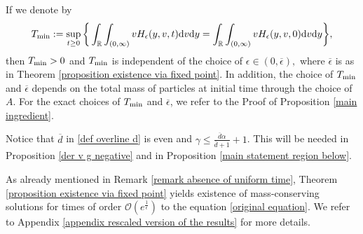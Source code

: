 \documentclass[11pt]{article}
\numberwithin{equation}{section}
\newcommand{\der}{\textup{d}}
\begin{document}
\begin{rmk}\label{remark time change depending on the mass}
If we denote by
    \begin{align*}
        T_{\textup{min}}:=\sup_{t\geq 0}\bigg\{\int_{\mathbb{R}}\int_{(0,\infty)}vH_{\epsilon}(y,v,t)\der v \der y=\int_{\mathbb{R}}\int_{(0,\infty)}vH_{\epsilon}(y,v,0)\der v \der y \bigg\},
    \end{align*}
    then $T_{\textup{min}}>0$ and $T_{\textup{min}}$ is independent of the choice of $\epsilon\in(0,\overline{\epsilon}),$ where $\overline{\epsilon}$ is as in Theorem \ref{proposition existence via fixed point}. In addition, the choice of $T_{\textup{min}}$ and $\overline{\epsilon}$ depends on the total mass of particles at initial time through the choice of $A$. For the exact choices of $T_{\textup{min}}$  and $\overline{\epsilon}$, we refer to the Proof of Proposition \ref{main ingredient}.
\end{rmk}
\begin{rmk}\label{we need function to be even minimum recovered}
 Notice that $\overline{d}$ in \eqref{def overline d} is even and $\gamma\leq \frac{\overline{d}\alpha}{\overline{d}+1}+1$. This will be needed in Proposition \ref{der v g negative} and in Proposition \ref{main statement region below}.
\end{rmk}
\begin{rmk}
As already mentioned in Remark \ref{remark absence of uniform time}, Theorem \ref{proposition existence via fixed point}  yields existence of mass-conserving solutions for times of order $\mathcal{O}(e^{\frac{1}{\epsilon}})$ to the equation \eqref{original equation}. We refer to Appendix \ref{appendix rescaled version of the results} for more details. 
\end{rmk}
\end{document}
